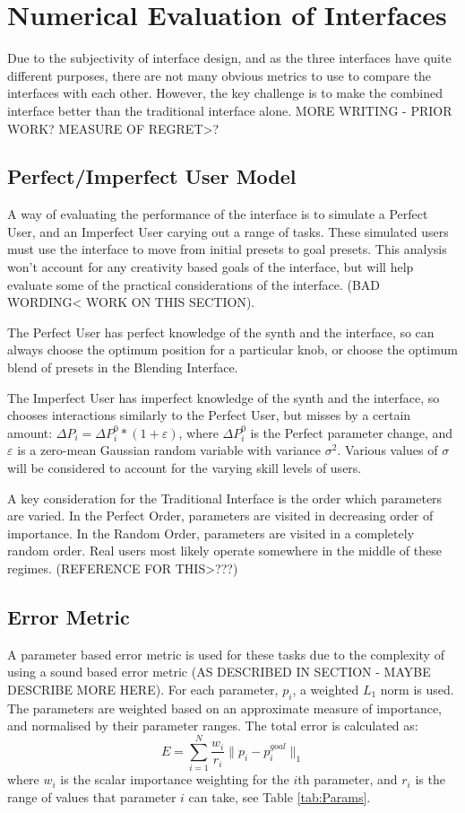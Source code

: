 \documentclass[11pt, oneside]{report}   	%
\begin{document}
\chapter{Numerical Evaluation of Interfaces}
Due to the subjectivity of interface design, and as the three interfaces have quite different purposes, there are not many obvious metrics to use to compare the interfaces with each other. However, the key challenge is to make the combined interface better than the traditional interface alone. MORE WRITING - PRIOR WORK? MEASURE OF REGRET>?
\section{Perfect/Imperfect User Model}
A way of evaluating the performance of the interface is to simulate a Perfect User, and an Imperfect User carying out a range of tasks. These simulated users must use the interface to move from initial presets to goal presets. This analysis won't account for any creativity based goals of the interface, but will help evaluate some of the practical considerations of the interface. (BAD WORDING< WORK ON THIS SECTION).
 
The Perfect User has perfect knowledge of the synth and the interface, so can always choose the optimum position for a particular knob, or choose the optimum blend of presets in the Blending Interface.

The Imperfect User has imperfect knowledge of the synth and the interface, so chooses interactions similarly to the Perfect User, but misses by a certain amount: $\Delta P_i = \Delta P_i^0 * (1 + \varepsilon)$, where $\Delta P_i^0$ is the Perfect parameter change, and $\varepsilon$ is a zero-mean Gaussian random variable with variance $\sigma^2$. Various values of $\sigma$ will be considered to account for the varying skill levels of users.

A key consideration for the Traditional Interface is the order which parameters are varied. In the Perfect Order, parameters are visited in decreasing order of importance. In the Random Order, parameters are visited in a completely random order. Real users most likely operate somewhere in the middle of these regimes. (REFERENCE FOR THIS>???)

\section{Error Metric}\label{sec:ErrorMetric}
A parameter based error metric is used for these tasks due to the complexity of using a sound based error metric (AS DESCRIBED IN SECTION - MAYBE DESCRIBE MORE HERE). 
For each parameter, $p_i$, a weighted $L_1$ norm is used. The parameters are weighted based on an approximate measure of importance, and normalised by their parameter ranges. The total error is calculated as:
\begin{equation}
E = \sum_{i=1}^{N}\frac{w_i}{r_i} \| p_i - p_i^{goal} \|_1 
\end{equation}
where $w_i$ is the scalar importance weighting for the $i$th parameter, and $r_i$ is the range of values that parameter $i$ can take, see Table \ref{tab:Params}.
\end{document}
